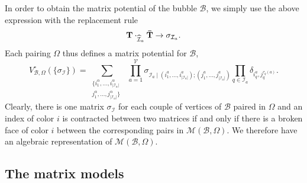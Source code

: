 \documentclass[aps,prd,10pt,notitlepage,nofootinbib,superscriptaddress,showkeys,showpacs]{revtex4-1}
\begin{document}
In order to obtain the matrix potential of the bubble ${\mathcal{B}}$, we simply use the above expression with the replacement rule 
\begin{equation}
{\bf T}\cdot_{{\widehat{\mathcal{I}}}_a} {\bf \bar T} \rightarrow \sigma_{{\mathcal{I}}_a}.
\end{equation}
Each pairing $\Omega$ thus defines a matrix potential for ${\mathcal{B}}$,
\begin{equation}
\label{matrixbubble}
V_{{\mathcal{B}}, \Omega}^\circ(\{ \sigma_{\mathcal{I}}\})=
\sum_{   
\substack {
{   \{i^\alpha_1,\dotsc, i^\alpha_{\lvert{\mathcal{I}}_\alpha\rvert} \ \   }\\
{   j^\alpha_1,\dotsc, j^\alpha_{\lvert{\mathcal{I}}_\alpha\rvert}\}   }
}}\ 
 \prod_{a=1}^{\mathcal{V}}\sigma_{{\mathcal{I}}_a\mid (i^a_1,\dotsc, i^a_{\lvert{\mathcal{I}}_a\rvert}); (j^a_1,\dotsc, j^a_{\lvert{\mathcal{I}}_a\rvert})    } \prod_{q\in{\mathcal{I}}_a  } \delta_{i_q^a, j_q^{\tau_q(a)}}.
\end{equation}
Clearly, there is one matrix $\sigma_{\mathcal{I}}$ for each couple of vertices of ${\mathcal{B}}$ paired in $\Omega$ and an index of color $i$ is contracted between two matrices if and only if there is a broken face of color $i$ between the corresponding pairs in ${\mathcal{M}}({\mathcal{B}}, \Omega)$. We therefore have an algebraic representation of ${\mathcal{M}}({\mathcal{B}}, \Omega)$.

\subsection{The matrix models}
\end{document}
